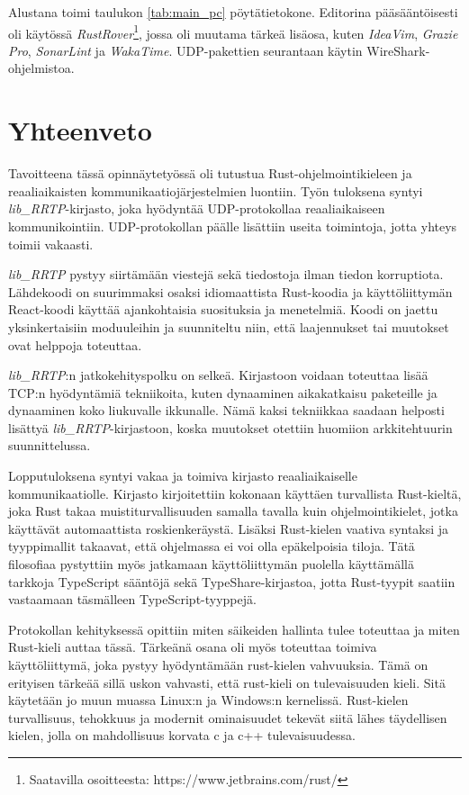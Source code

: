 \documentclass[a4paper,12pt]{article}
\begin{document}
    Alustana toimi taulukon \ref{tab:main_pc} pöytätietokone.
    Editorina pääsääntöisesti oli käytössä \textit{RustRover}\footnote{Saatavilla osoitteesta: https://www.jetbrains.com/rust/}, jossa oli muutama tärkeä lisäosa, kuten \textit{IdeaVim}, \textit{Grazie Pro}, \textit{SonarLint} ja \textit{WakaTime}.
    UDP-pakettien seurantaan käytin WireShark-ohjelmistoa.


    \section{Yhteenveto}
    Tavoitteena tässä opinnäytetyössä oli tutustua Rust-ohjelmointikieleen ja
    reaaliaikaisten kommunikaatiojärjestelmien luontiin. Työn tuloksena syntyi \textit{lib\_RRTP}-kirjasto, joka hyödyntää UDP-protokollaa reaaliaikaiseen kommunikointiin. UDP-protokollan päälle lisättiin useita toimintoja, jotta yhteys toimii vakaasti. \par

    \textit{lib\_RRTP} pystyy siirtämään viestejä sekä tiedostoja ilman tiedon korruptiota. Lähdekoodi on suurimmaksi osaksi idiomaattista Rust-koodia ja käyttöliittymän React-koodi käyttää ajankohtaisia suosituksia ja menetelmiä.
    Koodi on jaettu yksinkertaisiin moduuleihin ja suunniteltu niin, että laajennukset tai muutokset ovat helppoja toteuttaa.\par

    \textit{lib\_RRTP}:n jatkokehityspolku on selkeä. Kirjastoon voidaan toteuttaa lisää TCP:n hyödyntämiä tekniikoita, kuten dynaaminen aikakatkaisu paketeille ja dynaaminen koko liukuvalle ikkunalle. Nämä kaksi tekniikkaa saadaan helposti lisättyä \textit{lib\_RRTP}-kirjastoon, koska muutokset otettiin huomiion arkkitehtuurin suunnittelussa.\par

    Lopputuloksena syntyi vakaa ja toimiva kirjasto reaaliaikaiselle kommunikaatiolle. Kirjasto kirjoitettiin kokonaan käyttäen turvallista Rust-kieltä, joka 
    Rust takaa muistiturvallisuuden samalla tavalla kuin ohjelmointikielet, jotka käyttävät automaattista roskienkeräystä. Lisäksi Rust-kielen vaativa syntaksi ja
    tyyppimallit takaavat, että ohjelmassa ei voi olla epäkelpoisia tiloja.
    Tätä filosofiaa pystyttiin myös jatkamaan käyttöliittymän puolella käyttämällä
    tarkkoja TypeScript sääntöjä sekä TypeShare-kirjastoa, jotta Rust-tyypit saatiin vastaamaan täsmälleen TypeScript-tyyppejä.\par

    Protokollan kehityksessä opittiin miten säikeiden hallinta tulee toteuttaa ja miten Rust-kieli auttaa tässä. Tärkeänä osana oli myös toteuttaa toimiva käyttöliittymä, joka pystyy hyödyntämään rust-kielen vahvuuksia. Tämä on erityisen tärkeää sillä
    uskon vahvasti, että rust-kieli on tulevaisuuden kieli. Sitä käytetään jo muun muassa Linux:n ja Windows:n kernelissä. Rust-kielen turvallisuus, tehokkuus ja modernit ominaisuudet tekevät siitä lähes täydellisen kielen, jolla on mahdollisuus korvata c ja c++ tulevaisuudessa.


    \newpage
    \printbibliography
\end{document}
